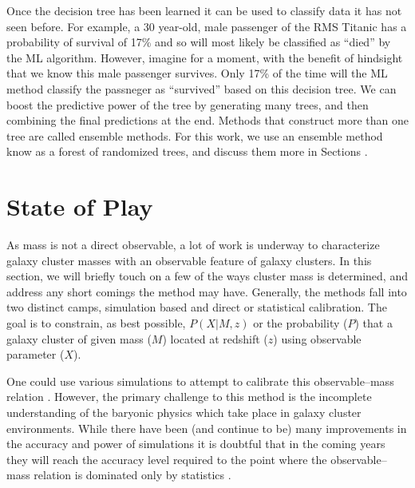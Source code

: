 Once the decision tree has been learned it can be used to classify data it has not seen before. For example, a 30 year-old, male passenger of the RMS Titanic has a probability of survival of 17\% and so will most likely be classified as ``died'' by the ML algorithm. However, imagine for a moment, with the benefit of hindsight that we know this male passenger survives. Only 17\% of the time will the ML method classify the passneger as ``survived'' based on this decision tree. We can boost the predictive power of the tree by generating many trees, and then combining the final predictions at the end. Methods that construct more than one tree are called ensemble methods. For this work, we use an ensemble method know as a forest of randomized trees, and discuss them more in Sections .

\section{State of Play}
As mass is not a direct observable, a lot of work is underway to characterize galaxy cluster masses with an observable feature of galaxy clusters. In this section, we will briefly touch on a few of the ways cluster mass is determined, and address any short comings the method may have. Generally, the methods fall into two distinct camps, simulation based and direct or statistical calibration. The goal is to constrain, as best possible, $P(X|M,z)$ or the probability ($P$) that a galaxy cluster of given mass ($M$) located at redshift ($z$) using observable parameter ($X$).

One could use various simulations to attempt to calibrate this observable--mass relation . However, the primary challenge to this method is the incomplete understanding of the baryonic physics which take place in galaxy cluster environments. While there have been (and continue to be) many improvements in the accuracy and power of simulations it is doubtful that in the coming years they will reach the accuracy level required to the point where the observable--mass relation is dominated only by statistics \citep{Weinberg2013}. 
 
